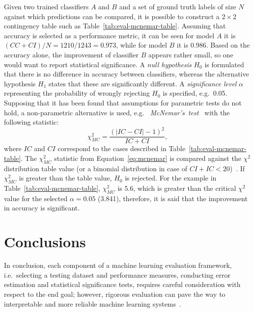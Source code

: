 Given two trained classifiers $A$ and $B$ and a set of ground truth labels of size $N$ against which predictions can be compared, it is possible to construct a $2\times 2$ contingency table such as Table~\ref{tab:eval-mcnemar-table}.
Assuming that accuracy is selected as a performance metric, it can be seen for model $A$ it is $(CC + CI) / N = 1210 / 1243 = 0.973$, while for model $B$ it is $0.986$.
Based on the accuracy alone, the improvement of classifier $B$ appears rather small, so one would want to report statistical significance.
A \emph{null hypothesis} $H_0$ is formulated that there is no difference in accuracy between classifiers, whereas the alternative hypothesis $H_1$ states that these are significantly different.
A \emph{significance level} $\alpha$ representing the probability of wrongly rejecting $H_0$ is specified, e.g.\ 0.05.
Supposing that it has been found that assumptions for parametric tests do not hold, a non-parametric alternative is used, e.g.~ \emph{McNemar's~test}~\citep{Mcnemar1947} with the following statistic:
\begin{equation}
    \label{eq:mcnemar}
    \chi^2_{MC} = \frac{(\lvert IC - CI  \rvert - 1)^2}{IC + CI},
\end{equation}
where $IC$ and $CI$ correspond to the cases described in Table~\ref{tab:eval-mcnemar-table}.
%
The $\chi^2_{MC}$ statistic from Equation~\ref{eq:mcnemar} is compared against the $\chi^2$ distribution table value (or a binomial distribution in case of $CI + IC < 20$)~\citep{Japkowic2011}.
If $\chi^2_{MC}$ is greater than the table value, $H_0$ is rejected.
%
For the example in Table~\ref{tab:eval-mcnemar-table}, $\chi^2_{MC}$ is 5.6, which is greater than the critical $\chi^2$ value for the selected $\alpha=0.05$ (3.841), therefore, it is said that the improvement in accuracy is significant.

\section{Conclusions}
In conclusion, each component of a machine learning evaluation framework, i.e.\ selecting a testing dataset and performance measures, conducting error estimation and statistical significance tests,
requires careful consideration with respect to the end goal; however, rigorous evaluation can pave the way to interpretable and more reliable machine learning systems~\citep{Doshi2017}.

